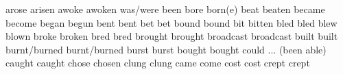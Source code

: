               {arose}{}	            {arisen}{}              {}{}
              {awoke}{}	            {awoken}{}              {}{}
                 {was/were}{}	        {been}{}                {}{}
               {bore}{}	            {born(e)}{}             {}{}
	            {beat}{}	            {beaten}{}              {}{}
	            {became}{}	            {become}{}              {}{}
	            {began}{}	            {begun}{}               {}{}
	            {bent}{}	            {bent}{}                {}{}
	            {bet}{}	                {bet}{}                 {}{}
	            {bound}{}	            {bound}{}               {}{}
	            {bit}{}	                {bitten}{}              {}{}
	            {bled}{}	            {bled}{}                {}{}
	            {blew}{}	            {blown}{}               {}{}
	            {broke}{}	            {broken}{}              {}{}
	            {bred}{}	            {bred}{}                {}{}
	            {brought}{}	            {brought}{}             {}{}
	        {broadcast}{}	        {broadcast}{}           {}{}
	            {built}{}	            {built}{}               {}{}
	            {burnt/burned}{}	    {burnt/burned}{}        {}{}
	            {burst}{}	            {burst}{}               {}{}
	            {bought}{}	            {bought}{}              {}{}
	            {could}{}	            {... (been able)}{}     {}{}
	            {caught}{}	            {caught}{}              {}{}
	            {chose}{}	            {chosen}{}              {}{}
	            {clung}{}	            {clung}{}               {}{}
	            {came}{}	            {come}{}                {}{}
	            {cost}{}	            {cost}{}                {}{}
	            {crept}{}	            {crept}{}               {}{}
